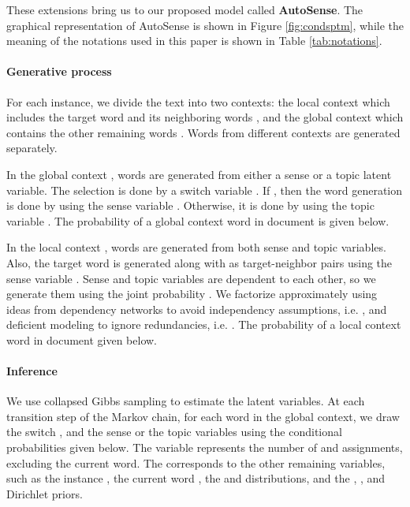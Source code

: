 \documentclass[letterpaper]{article} \usepackage{aaai19}
\begin{document}
These extensions bring us to our proposed model called \textbf{AutoSense}. The graphical representation of AutoSense is shown in Figure \ref{fig:condsptm}, while the meaning of the notations used in this paper is shown in Table \ref{tab:notations}.

\paragraph{Generative process}

For each instance, we divide the text into two contexts: the local context  which includes the target word  and its neighboring words , and the global context  which contains the other remaining words . Words from different contexts are generated separately.

In the global context , words  are generated from either a sense  or a topic  latent variable. The selection is done by a switch variable . If , then the word generation is done by using the sense variable . Otherwise, it is done by using the topic variable . The probability of a global context word  in document  is given below.

In the local context , words  are generated from both sense  and topic  variables. Also, the target word  is generated along with  as target-neighbor pairs  using the sense variable . Sense and topic variables are dependent to each other, so we generate them using the joint probability . We factorize  approximately using ideas from dependency networks  \cite{heckerman2000dependency} to avoid independency assumptions, i.e. , and deficient modeling \cite{brown1993mathematics} to ignore redundancies, i.e. . The probability of a local context word  in document  given below.


\paragraph{Inference}

We use collapsed Gibbs sampling \cite{griffiths2004finding} to estimate the latent variables. At each transition step of the Markov chain, for each word  in the global context, we draw the switch , and the sense  or the topic  variables using the conditional probabilities given below. The variable  represents the number of  and  assignments, excluding the current word. The  corresponds to the other remaining variables, such as the instance , the current word , the  and  distributions, and the , , and  Dirichlet priors.
\end{document}
